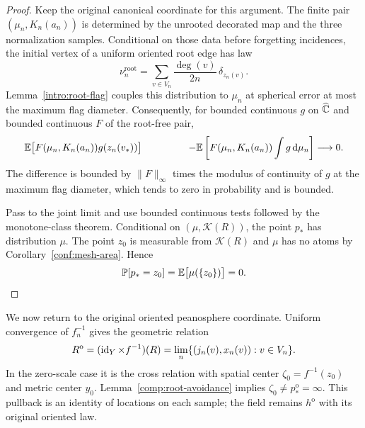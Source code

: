 \begin{proof}
Keep the original canonical coordinate for this argument.  The
finite pair $(\mu_n,K_n(a_n))$ is determined by the unrooted
decorated map and the three normalization samples.  Conditional
on those data before forgetting incidences, the initial vertex
of a uniform oriented root edge has law
\[
 \nu_n^{\mathrm{root}}
   =\sum_{v\in V_n}\frac{\deg(v)}{2n}\,\delta_{z_n(v)}.
\]
Lemma~\ref{intro:root-flag} couples this distribution to $\mu_n$
at spherical error at most the maximum flag diameter.  Consequently,
for bounded continuous $g$ on $\widehat{\mathbb C}$ and bounded continuous $F$
of the root-free pair,
\begin{align*}
 &\EE\bigl[F(\mu_n,K_n(a_n))g(z_n(v_*))\bigr]\
 &\hspace{12mm}-
 \EE\left[F(\mu_n,K_n(a_n))\int g\,\dd\mu_n\right]
 \longrightarrow0.
\end{align*}
The difference is bounded by $\|F\|_\infty$ times the modulus of
continuity of $g$ at the maximum flag diameter, which tends to
zero in probability and is bounded.

Pass to the joint limit and use bounded continuous tests followed
by the monotone-class theorem.  Conditional on
$(\mu,\mathcal K(R))$, the point $p_*$ has distribution $\mu$.
The point $z_0$ is measurable from $\mathcal K(R)$ and $\mu$ has
no atoms by Corollary~\ref{conf:mesh-area}.  Hence
\[
 \mathbb P[p_*=z_0]
   =\mathbb E\bigl[\mu(\{z_0\})\bigr]=0.
\]
\end{proof}

We now return to the original oriented peanosphere coordinate.
Uniform convergence of $f_n^{-1}$ gives the geometric relation
\begin{equation}
 \label{comp:oriented-relation}
 R^{\mathrm o}=(\id_Y\times f^{-1})(R)
  =\lim_n\{(j_n(v),x_n(v)):v\in V_n\}.
\end{equation}
In the zero-scale case it is the cross relation with spatial center
$\zeta_0=f^{-1}(z_0)$ and metric center $y_0$.
Lemma~\ref{comp:root-avoidance} implies
$\zeta_0\ne p_*^{\mathrm o}=\infty$.  This pullback is an identity
of locations on each sample; the field remains $h^{\mathrm o}$ with
its original oriented law.

